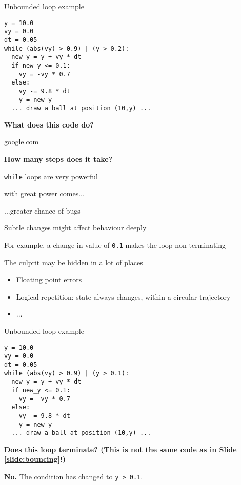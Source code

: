 \documentclass{beamer}
\begin{document}
\begin{frame}[fragile]{Unbounded loop example}
\label{slide:bouncing}

\begin{lstlisting}[basicstyle=\ttfamily\tiny]
y = 10.0
vy = 0.0
dt = 0.05
while (abs(vy) > 0.9) | (y > 0.2):
  new_y = y + vy * dt
  if new_y <= 0.1:
    vy = -vy * 0.7
  else:
    vy -= 9.8 * dt
    y = new_y
  ... draw a ball at position (10,y) ...
\end{lstlisting}

\textbf{What does this code do?}

\url{google.com}

\textbf{How many steps does it take?}
\end{frame}

\begin{slide}{
\item \texttt{while} loops are very powerful
\item with great power comes...
\pause
\item ...greater chance of bugs
}\end{slide}

\begin{slide}{
\item Subtle changes might affect behaviour deeply
\item For example, a change in value of \texttt{0.1} makes the loop non-terminating
\item The culprit may be hidden in a lot of places
\begin{itemize}
\item Floating point errors
\item Logical repetition: state always changes, within a circular trajectory
\item ...
\end{itemize}
}\end{slide}

\begin{frame}[fragile]{Unbounded loop example}
\begin{lstlisting}[basicstyle=\ttfamily\tiny]
y = 10.0
vy = 0.0
dt = 0.05
while (abs(vy) > 0.9) | (y > 0.1):
  new_y = y + vy * dt
  if new_y <= 0.1:
    vy = -vy * 0.7
  else:
    vy -= 9.8 * dt
    y = new_y
  ... draw a ball at position (10,y) ...
\end{lstlisting}

\textbf{Does this loop terminate? (This is not the same code as in Slide \ref{slide:bouncing}!)}

\pause

\textbf{No.} The condition has changed to \texttt{y > 0.1}.
\end{frame}
\end{document}
